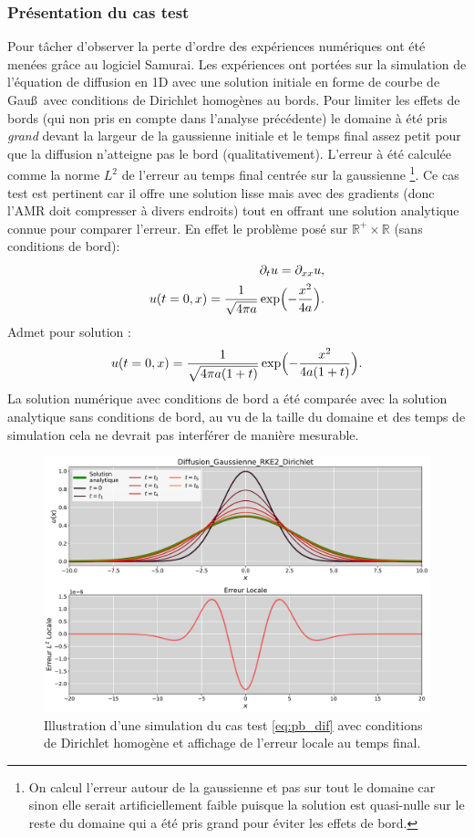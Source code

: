 \subsubsection{Présentation du cas test}
    Pour tâcher d'observer la perte d'ordre des expériences numériques ont été menées grâce au logiciel Samurai.
    Les expériences ont portées sur la simulation de l'équation de diffusion en 1D avec une solution initiale 
    en forme de courbe de Gau\ss\, avec conditions de Dirichlet homogènes au bords. 
    Pour limiter les effets de bords (qui non pris en compte dans l'analyse précédente) le domaine à été pris \textit{grand}
    devant la largeur de la gaussienne initiale et le temps final assez petit pour que la diffusion n'atteigne pas le bord (qualitativement).
    L'erreur à été calculée comme la norme $L^2$ de l'erreur au temps final centrée sur la gaussienne
    \footnote{On calcul l'erreur autour de la gaussienne et pas sur tout le domaine car sinon elle serait artificiellement faible puisque la solution est quasi-nulle sur le reste du domaine qui a été pris grand pour éviter les effets de bord.}.
    Ce cas test est pertinent car il offre une solution lisse mais avec des gradients (donc l'AMR doit compresser à divers endroits)
    tout en offrant une solution analytique connue pour comparer l'erreur. 
    En effet le problème posé sur $\mathbb R^+ \times \mathbb R$ (sans conditions de bord): 
    \begin{align}
        \partial_t u = \partial_{xx} u,\label{eq:pb_dif}\\\notag
        u(t=0,x) = \frac{1}{\sqrt{4 \pi a }} \exp\Bigl( - \frac{x^2}{4a}\Bigr).
    \end{align}
    Admet pour solution :
    \begin{align}
        u(t=0,x) = \frac{1}{\sqrt{4 \pi a (1+t)}} \exp\Bigl(-\frac{x^2}{4a(1+t)}\Bigr).
    \end{align}
    La solution numérique avec conditions de bord a été comparée avec la solution analytique sans conditions de bord, 
    au vu de la taille du domaine et des temps de simulation cela ne devrait pas interférer de manière mesurable.

    \begin{figure}[htbp]
        \centering
        \includegraphics[width=.8\textwidth]{media/4_travail/1_AMR/illustration/Diffusion_Gaussienne_RKE2_Dirichlet.pdf}
        \caption{Illustration d'une simulation du cas test \ref{eq:pb_dif} avec conditions de Dirichlet homogène et
        affichage de l'erreur locale au temps final.}
        \label{fig:diffusion_gaussienne}
    \end{figure}
